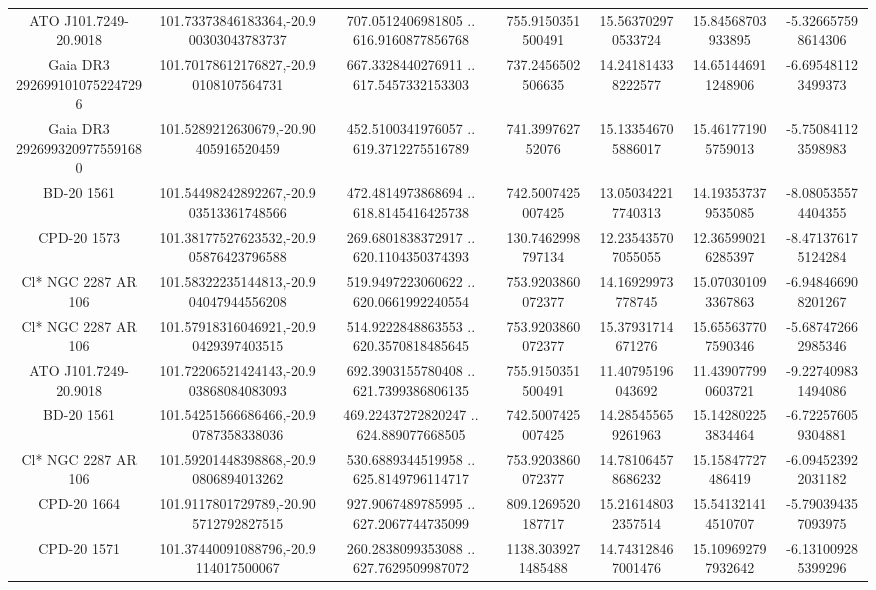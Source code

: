 \begin{table}
\begin{tabular}{ccccccc}
ATO J101.7249-20.9018 & 101.73373846183364,-20.900303043783737 & 707.0512406981805 .. 616.9160877856768 & 755.9150351500491 & 15.563702970533724 & 15.84568703933895 & -5.326657598614306 \\
Gaia DR3 2926991010752247296 & 101.70178612176827,-20.90108107564731 & 667.3328440276911 .. 617.5457332153303 & 737.2456502506635 & 14.241814338222577 & 14.651446911248906 & -6.695481123499373 \\
Gaia DR3 2926993209775591680 & 101.5289212630679,-20.90405916520459 & 452.5100341976057 .. 619.3712275516789 & 741.399762752076 & 15.133546705886017 & 15.461771905759013 & -5.750841123598983 \\
BD-20  1561 & 101.54498242892267,-20.903513361748566 & 472.4814973868694 .. 618.8145416425738 & 742.5007425007425 & 13.050342217740313 & 14.193537379535085 & -8.080535574404355 \\
CPD-20  1573 & 101.38177527623532,-20.905876423796588 & 269.6801838372917 .. 620.1104350374393 & 130.7462998797134 & 12.235435707055055 & 12.365990216285397 & -8.471376175124284 \\
Cl* NGC 2287     AR     106 & 101.58322235144813,-20.904047944556208 & 519.9497223060622 .. 620.0661992240554 & 753.9203860072377 & 14.16929973778745 & 15.070301093367863 & -6.948466908201267 \\
Cl* NGC 2287     AR     106 & 101.57918316046921,-20.90429397403515 & 514.9222848863553 .. 620.3570818485645 & 753.9203860072377 & 15.37931714671276 & 15.655637707590346 & -5.687472662985346 \\
ATO J101.7249-20.9018 & 101.72206521424143,-20.903868084083093 & 692.3903155780408 .. 621.7399386806135 & 755.9150351500491 & 11.40795196043692 & 11.439077990603721 & -9.227409831494086 \\
BD-20  1561 & 101.54251566686466,-20.90787358338036 & 469.22437272820247 .. 624.889077668505 & 742.5007425007425 & 14.285455659261963 & 15.142802253834464 & -6.722576059304881 \\
Cl* NGC 2287     AR     106 & 101.59201448398868,-20.90806894013262 & 530.6889344519958 .. 625.8149796114717 & 753.9203860072377 & 14.781064578686232 & 15.15847727486419 & -6.094523922031182 \\
CPD-20  1664 & 101.9117801729789,-20.905712792827515 & 927.9067489785995 .. 627.2067744735099 & 809.1269520187717 & 15.216148032357514 & 15.541321414510707 & -5.790394357093975 \\
CPD-20  1571 & 101.37440091088796,-20.9114017500067 & 260.2838099353088 .. 627.7629509987072 & 1138.3039271485488 & 14.743128467001476 & 15.109692797932642 & -6.131009285399296 \\

\end{tabular}
\end{table}
